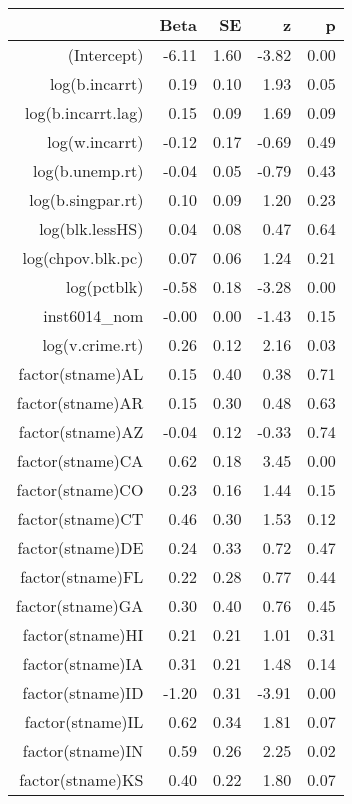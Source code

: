 \begin{table}[ht]
\centering
\begin{tabular}{rrrrr}
  \hline
 & Beta & SE & z & p \\ 
  \hline
(Intercept) & -6.11 & 1.60 & -3.82 & 0.00 \\ 
  log(b.incarrt) & 0.19 & 0.10 & 1.93 & 0.05 \\ 
  log(b.incarrt.lag) & 0.15 & 0.09 & 1.69 & 0.09 \\ 
  log(w.incarrt) & -0.12 & 0.17 & -0.69 & 0.49 \\ 
  log(b.unemp.rt) & -0.04 & 0.05 & -0.79 & 0.43 \\ 
  log(b.singpar.rt) & 0.10 & 0.09 & 1.20 & 0.23 \\ 
  log(blk.lessHS) & 0.04 & 0.08 & 0.47 & 0.64 \\ 
  log(chpov.blk.pc) & 0.07 & 0.06 & 1.24 & 0.21 \\ 
  log(pctblk) & -0.58 & 0.18 & -3.28 & 0.00 \\ 
  inst6014\_nom & -0.00 & 0.00 & -1.43 & 0.15 \\ 
  log(v.crime.rt) & 0.26 & 0.12 & 2.16 & 0.03 \\ 
  factor(stname)AL & 0.15 & 0.40 & 0.38 & 0.71 \\ 
  factor(stname)AR & 0.15 & 0.30 & 0.48 & 0.63 \\ 
  factor(stname)AZ & -0.04 & 0.12 & -0.33 & 0.74 \\ 
  factor(stname)CA & 0.62 & 0.18 & 3.45 & 0.00 \\ 
  factor(stname)CO & 0.23 & 0.16 & 1.44 & 0.15 \\ 
  factor(stname)CT & 0.46 & 0.30 & 1.53 & 0.12 \\ 
  factor(stname)DE & 0.24 & 0.33 & 0.72 & 0.47 \\ 
  factor(stname)FL & 0.22 & 0.28 & 0.77 & 0.44 \\ 
  factor(stname)GA & 0.30 & 0.40 & 0.76 & 0.45 \\ 
  factor(stname)HI & 0.21 & 0.21 & 1.01 & 0.31 \\ 
  factor(stname)IA & 0.31 & 0.21 & 1.48 & 0.14 \\ 
  factor(stname)ID & -1.20 & 0.31 & -3.91 & 0.00 \\ 
  factor(stname)IL & 0.62 & 0.34 & 1.81 & 0.07 \\ 
  factor(stname)IN & 0.59 & 0.26 & 2.25 & 0.02 \\ 
  factor(stname)KS & 0.40 & 0.22 & 1.80 & 0.07 \\ 

\end{tabular}
\end{table}
